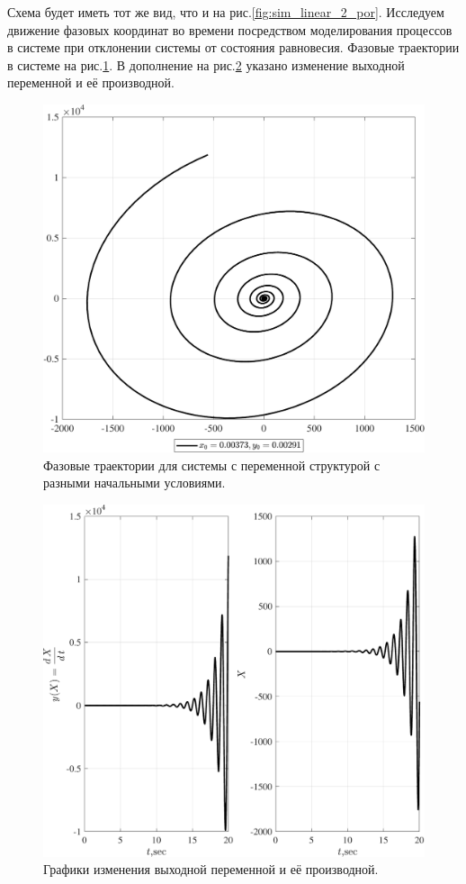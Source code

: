 Схема будет иметь тот же вид, что и на рис.\ref{fig:sim_linear_2_por}.
Исследуем движение фазовых координат во времени посредством моделирования процессов в системе при отклонении системы от состояния равновесия. Фазовые траектории в системе на рис.\ref{fig:linear_2_por_ft_focus}. 
В дополнение на рис.\ref{fig:linear_2_por_sv_focus} указано изменение выходной переменной и её производной. 
\begin{figure}[!h]\centering
\includegraphics[width=1.0\linewidth]{images/linear_2_por_ft_focus}
\caption{ Фазовые траектории для системы с переменной структурой с разными начальными условиями.}\label{fig:linear_2_por_ft_focus}
\end{figure}
\begin{figure}[!h]\centering
\includegraphics[width=1.0\linewidth]{images/linear_2_por_sv_focus}
\caption{ Графики изменения выходной переменной и её производной.}\label{fig:linear_2_por_sv_focus}
\end{figure}
